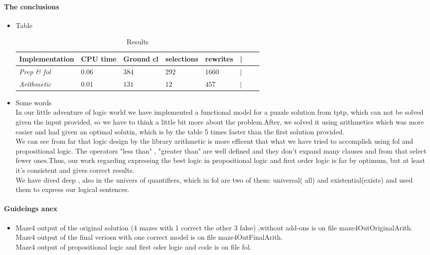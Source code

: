 \paragraph{The conclusions}
\begin{itemize}
\item{Table}\\
\begin{table}
\begin{center}
\caption{Results}
\begin{tabular}{|p{3cm}lp{3cm}lp{3cm}lp{3cm}|p{3cm}|}\hline
\textbf{Implementation}&\textbf{CPU time} & \textbf{Ground cl}& \textbf{selections}& \textbf{rewrites} & | \\ \hline
{\it Prep \& fol}  & $0.06$  & $384$ & $292$ & $1660$ &$ |$\\ \hline
{\it Arithmetic} & $0.01$ & $131$& $12$& $457$  &$ |$\\  \hline
\end{tabular}
\end{center}
\end{table}
\item {Some words}\\
	\tab In our little adventure of logic world we have implemented a functional model for a puzzle solution from tptp, which can not be solved given the input provided, so we have to think a little bit more about the problem.After, we solved it using arithmetics which was more easier and had given an optimal solutin, which is by the table  5 times faster than the first solution provided.\\	
	\tab We can see from far that logic design by the library arithmetic is more efficent that what we have tried to accomplish using fol and propositional logic. The operators "less than" , "greater than" are well defined and they don't expand many clauses and from that select fewer ones.Thus, our work regarding expressing the best logic in propositional logic and first order logic is far by optimum, but at least it's consistent and gives correct results.  \\
	\tab We have dived deep , also in the univers of quantifiers, which in fol are two of them: universal( all) and existential(exists) and used them to express our logical sentences.\\
\end{itemize}

\paragraph{Guideings anex}
\begin{itemize}
\item
	\tab Maze4 output of the original solution (4 mazes with 1 correct the other 3 false) ,without add-ons is on file maze4OutOriginalArith.\\
	\tab  Maze4 output of the final veriosn with one correct model  is on file maze4OutFinalArith.\\
	\tab Maze4 output of propositional logic and first oder logic and code is on file fol.\\

\end{itemize}